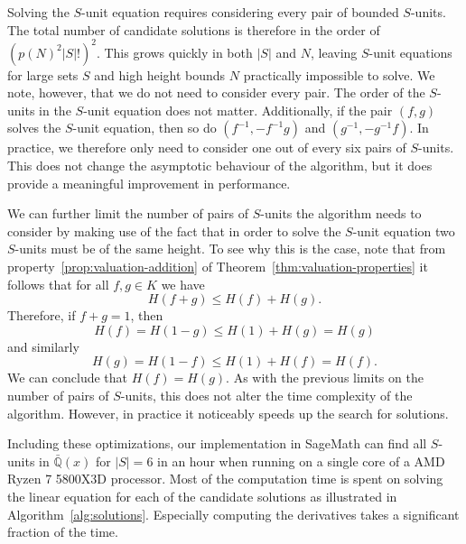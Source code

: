 Solving the \(S\)-unit equation requires considering every pair of bounded \(S\)-units. The total number of candidate solutions is therefore in the order of \({({p(N)}^{2}|S|!{})}^{2}\). This grows quickly in both \(|S|\) and \(N\), leaving \(S\)-unit equations for large sets \(S\) and high height bounds \(N\) practically impossible to solve. We note, however, that we do not need to consider every pair. The order of the \(S\)-units in the \(S\)-unit equation does not matter. Additionally, if the pair \((f, g)\) solves the \(S\)-unit equation, then so do \((f^{-1}, - f^{-1}g)\) and \((g^{-1}, - g^{-1}f)\). In practice, we therefore only need to consider one out of every six pairs of \(S\)-units. This does not change the asymptotic behaviour of the algorithm, but it does provide a meaningful improvement in performance.

We can further limit the number of pairs of \(S\)-units the algorithm needs to consider by making use of the fact that in order to solve the \(S\)-unit equation two \(S\)-units must be of the same height. To see why this is the case, note that from property~\ref{prop:valuation-addition} of Theorem~\ref{thm:valuation-properties} it follows that for all \(f, g \in K\) we have
\[H(f + g) \leq H(f) + H(g).\]
Therefore, if \(f + g = 1\), then
\[H(f) = H(1 - g) \leq H(1) + H(g) = H(g)\]
and similarly
\[H(g) = H(1 - f) \leq H(1) + H(f) = H(f).\]
We can conclude that \(H(f) = H(g)\). As with the previous limits on the number of pairs of \(S\)-units, this does not alter the time complexity of the algorithm. However, in practice it noticeably speeds up the search for solutions.

Including these optimizations, our implementation in SageMath can find all \(S\)-units in \(\bar{\mathbb{Q}}(x)\) for \(|S| = 6\) in an hour when running on a single core of a AMD Ryzen 7 5800X3D processor. Most of the computation time is spent on solving the linear equation for each of the candidate solutions as illustrated in Algorithm~\ref{alg:solutions}. Especially computing the derivatives takes a significant fraction of the time.

